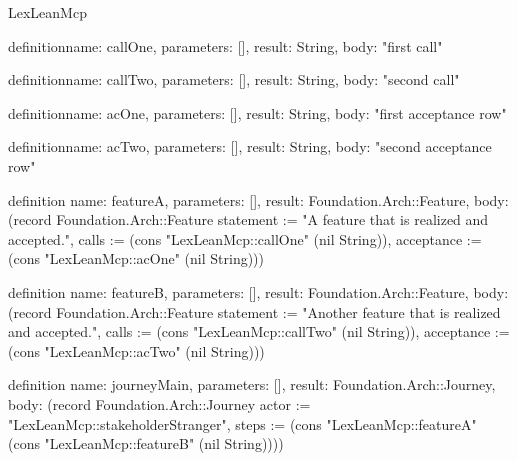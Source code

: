 \begin{lexlean}{LexLeanMcp}
\begin{semanticmodule}
definition{name: callOne, parameters: [], result: String, body: "first call"}

definition{name: callTwo, parameters: [], result: String, body: "second call"}

definition{name: acOne, parameters: [], result: String, body: "first acceptance row"}

definition{name: acTwo, parameters: [], result: String, body: "second acceptance row"}

definition{
  name: featureA,
  parameters: [],
  result: Foundation.Arch::Feature,
  body: (record Foundation.Arch::Feature {statement := "A feature that is realized and accepted.", calls := (cons "LexLeanMcp::callOne" (nil String)), acceptance := (cons "LexLeanMcp::acOne" (nil String))})
}

definition{
  name: featureB,
  parameters: [],
  result: Foundation.Arch::Feature,
  body: (record Foundation.Arch::Feature {statement := "Another feature that is realized and accepted.", calls := (cons "LexLeanMcp::callTwo" (nil String)), acceptance := (cons "LexLeanMcp::acTwo" (nil String))})
}

definition{
  name: journeyMain,
  parameters: [],
  result: Foundation.Arch::Journey,
  body: (record Foundation.Arch::Journey {actor := "LexLeanMcp::stakeholderStranger", steps := (cons "LexLeanMcp::featureA" (cons "LexLeanMcp::featureB" (nil String)))})
}
\end{semanticmodule}
\end{lexlean}
